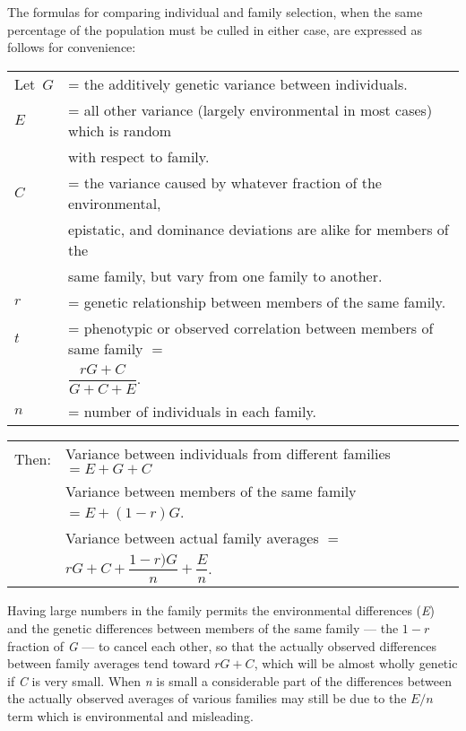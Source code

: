 The formulas for comparing individual and family selection, when
the same percentage of the population must be culled in either case,
are expressed as follows for convenience:
\vspace{-0.2cm}
\begin{table}[h]
	\centering
	\begin{tabular}{R{1cm}L{11cm}}
		Let~$G$ & = the additively genetic variance between individuals. \\
		$E$ & = all other variance (largely environmental in most cases) which is random\\
			& with respect to family. \\
		$C$ & = the variance caused by whatever fraction of the environmental,\\
			& epistatic, and dominance deviations are alike for members of the\\
			& same family, but vary from one family to another. \\
		$r$ & = genetic relationship between members of the same family. \\
		$t$ & = phenotypic or observed correlation between members of same
family $=$ \\
			& $\dfrac{rG + C}{G + C + E}$. \\
		$n$ & = number of individuals in each family.
	\end{tabular}
\end{table}
\vspace{-0.6cm}
\begin{table}[h]
	\centering
	\begin{tabular}{R{1cm}L{11cm}}
	Then: & Variance between individuals from different families \(= E + G + C\) \\
		  & Variance between members of the same family \(= E + (1 - r)G\). \\
		  & Variance between actual family averages $=$ \\
		  & \hspace{2.5em}\(rG + C + \dfrac{1 - r)G}{n} + \dfrac{E}{n}\).
	\end{tabular}
\end{table}
\vspace{-0.2cm}

Having large numbers in the family permits the environmental differences
(\textit{E}) and the genetic differences between members of the same
family --- the $1 - r$ fraction of \textit{G} --- to cancel each other, so that the actually
observed differences between family averages tend toward $rG + C$,
which will be almost wholly genetic if \textit{C} is very small. When \textit{n} is small
a considerable part of the differences between the actually observed
averages of various families may still be due to the $E/n$ term which is
environmental and misleading.

